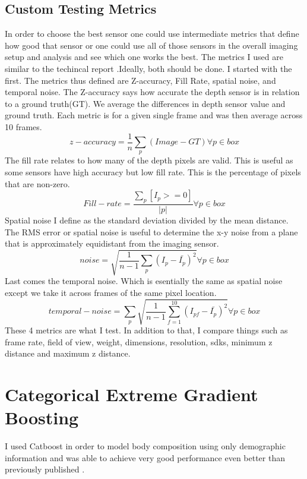 \subsection{Custom Testing Metrics}
In order to choose the best sensor one could use intermediate metrics that define how good that sensor or one could use all of those sensors in the overall imaging setup and analysis and see which one works the best. The metrics I used are similar to the techincal report \cite{depthtesting}.Ideally, both should be done. I started with the first. The metrics thus defined are Z-accuracy, Fill Rate, spatial noise, and temporal noise. The Z-accuracy says how accurate the depth sensor is in relation to a ground truth(GT). We average the differences in depth sensor value and ground truth. Each metric is for a given single frame and was then average across 10 frames.
\begin{equation}
	z-accuracy = \frac{1}{n}\sum_p(Image - GT) \forall p \in box
\end{equation}
The fill rate relates to how many of the depth pixels are valid. This is useful as some sensors have high accuracy but low fill rate. This is the percentage of pixels that are non-zero.
\begin{equation}
	Fill-rate = \frac{\sum_p[I_p >= 0]}{\vert p \vert} \forall p \in box
\end{equation}
Spatial noise I define as the standard deviation divided by the mean distance.
The RMS error or spatial noise is useful to determine the x-y noise from a plane that is approximately equidistant from the imaging sensor.
\begin{equation}
	noise = \sqrt{\frac{1}{n-1}\sum_p(I_p-{\bar{I_p}})^2} \forall p \in box
\end{equation}
Last comes the temporal noise. Which is esentially the same as spatial noise except we take it across frames of the same pixel location.
\begin{equation}
	temporal-noise = \sum_p\sqrt{\frac{1}{n-1}\sum_{f=1}^{10}(I_{pf}-\bar{I_p})^2} \forall p \in box
\end{equation}
These 4 metrics are what I test. In addition to that, I compare things such as frame rate, field of view, weight, dimensions, resolution, sdks, minimum z distance and maximum z distance.

\section{Categorical Extreme Gradient Boosting}
I used Catboost \cite{DBLP:journals/corr/DorogushGGKPV17} in order to model body composition using only demographic information and was able to achieve very good performance even better than previously published \cite{article} .

